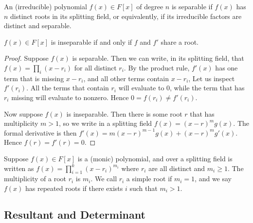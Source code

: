 \begin{definition}
    An (irreducible) polynomial \(f(x) \in F[x]\) of degree \(n\)
    is separable if \(f(x)\) has \(n\) distinct roots in its splitting field,
    or equivalently, if its irreducible factors are distinct and separable.
\end{definition}
\begin{proposition}\label{prop:derivative-inseparability}
    \(f(x) \in F[x]\) is inseparable
    if and only if \(f\) and \(f'\) share a root.
\end{proposition}
\begin{proof}
    Suppose \(f(x)\) is separable.
    Then we can write, in its splitting field,
    that \(f(x) = \prod_i (x-r_i)\) for all distinct \(r_i\).
    By the product rule,
    \(f'(x)\) has one term that is missing \(x-r_i\),
    and all other terms contain \(x-r_i\),
    Let us inspect \(f'(r_i)\).
    All the terms that contain \(r_i\) will evaluate to 0,
    while the term that has \(r_i\) missing will evaluate to nonzero.
    Hence \(0 = f(r_i) \neq f'(r_i)\).

    Now suppose \(f(x)\) is inseparable.
    Then there is some root \(r\) that has multiplicity \(m > 1\),
    so we write in a splitting field \(f(x) = {(x-r)}^m g(x)\).
    The formal derivative is then \(f'(x) = m{(x-r)}^{m-1} g(x) + {(x-r)}^m g'(x)\).
    Hence \(f(r) = f'(r) = 0\).
\end{proof}

\begin{definition}
    Suppose \(f(x) \in F[x]\) is a (monic) polynomial,
    and over a splitting field is written as
    \(f(x) = \prod_{i=1}^k {(x-r_i)}^{m_i}\)
    where \(r_i\) are all distinct and \(m_i \geq 1\).
    The multiplicity of a root \(r_i\) is \(m_i\).
    We call \(r_i\) a simple root if \(m_i = 1\),
    and we say \(f(x)\) has repeated roots if there exists \(i\)
    such that \(m_i > 1\).
\end{definition}

\subsection*{Resultant and Determinant}

